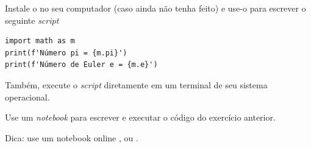\begin{exer}
  Instale o {\spyder} no seu computador (caso ainda não tenha feito) e use-o para escrever o seguinte {\it script}
\begin{lstlisting}
import math as m
print(f'Número pi = {m.pi}')
print(f'Número de Euler e = {m.e}')
\end{lstlisting}
  Também, execute o {\it script} diretamente em um terminal de seu sistema operacional.
\end{exer}

\begin{exer}
  Use um {\it notebook} {\python} para escrever e executar o código do exercício anterior.
\end{exer}
\begin{resp}
  Dica: use um notebook online {\colab}, {\kaggle} ou {\jupyter}.
\end{resp}